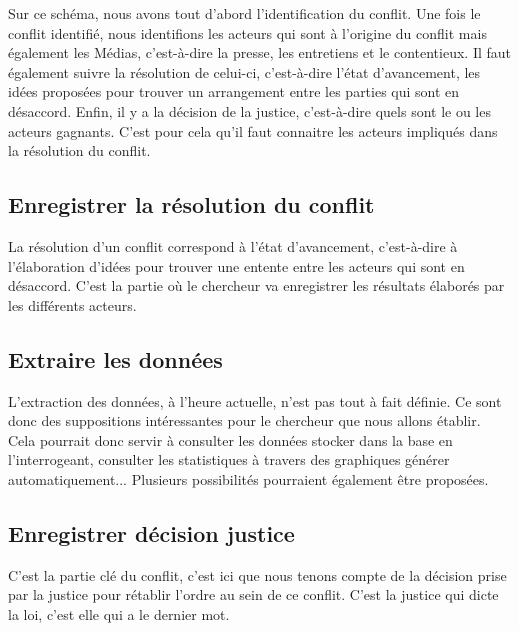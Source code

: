 \documentclass[12pt,a4paper]{article}
\newcommand{\sommaire}{\shorttoc{Sommaire}{2}}
\begin{document}
Sur ce schéma, nous avons tout d'abord l'identification du conflit. Une fois le conflit identifié, nous identifions les acteurs qui sont à l'origine du conflit mais également les Médias, c'est-à-dire la presse, les entretiens et le contentieux. Il faut également suivre la résolution de celui-ci, c'est-à-dire l'état d'avancement, les idées proposées pour trouver un arrangement entre les parties qui sont en désaccord. Enfin, il y a la décision de la justice, c'est-à-dire quels sont le ou les acteurs gagnants. C'est pour cela qu'il faut connaitre les acteurs impliqués dans la résolution du conflit.

\subsection{Enregistrer la résolution du conflit}
La résolution d'un conflit correspond à l'état d'avancement, c'est-à-dire à l'élaboration d'idées pour trouver une entente entre les acteurs qui sont en désaccord. C'est la partie où le chercheur va enregistrer les résultats élaborés par les différents acteurs.

\subsection{Extraire les données}
L'extraction des données, à l'heure actuelle, n'est pas tout à fait définie. Ce sont donc des suppositions intéressantes pour le chercheur que nous allons établir. Cela pourrait donc servir à consulter les données stocker dans la base en l'interrogeant, consulter les statistiques à travers des graphiques générer automatiquement... Plusieurs possibilités pourraient également être proposées.

\subsection{Enregistrer décision justice}
C'est la partie clé du conflit, c'est ici que nous tenons compte de la décision prise par la justice pour rétablir l'ordre au sein de ce conflit. C'est la justice qui dicte la loi, c'est elle qui a le dernier mot.



\end{document}
